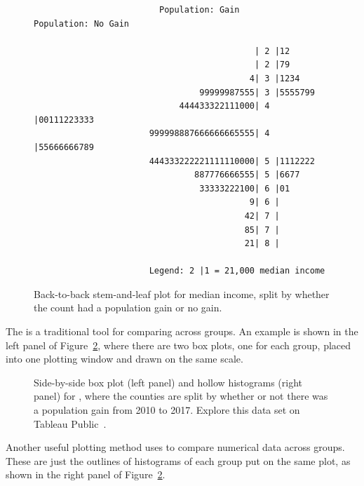 \begin{figure}
\begin{verbatim}
                         Population: Gain           Population: No Gain

                                            | 2 |12                          
                                            | 2 |79                          
                                           4| 3 |1234                    
                                 99999987555| 3 |5555799                 
                             444433322111000| 4 |00111223333              
                       999998887666666665555| 4 |55666666789                
                       444333222221111110000| 5 |1112222                    
                                887776666555| 5 |6677                       
                                 33333222100| 6 |01                          
                                           9| 6 |                             
                                          42| 7 |                             
                                          85| 7 |                             
                                          21| 8 |    
               
                       Legend: 2 |1 = 21,000 median income
\end{verbatim}
\caption{Back-to-back stem-and-leaf plot for median income, split by whether the count had a population gain or no gain.}
\label{stemandleafincomepopgainloss}
\end{figure}

The 
is a traditional tool for comparing across groups.
An example is shown in the left panel of
Figure~\ref{countyIncomeSplitByPopGain},
where there are two box plots, one for each group,
placed into one plotting window and drawn on the same scale.

\begin{figure}
  \centering
{}
  \caption{Side-by-side box plot (left panel)
      and hollow histograms (right panel) for
      ,
      where the counties are split by whether or not there was a population gain from 2010 to 2017.  Explore this data set on Tableau Public~.}
  \label{countyIncomeSplitByPopGain}
\end{figure}

Another useful plotting method uses  to compare numerical data across groups. These are just the outlines of histograms of each group put on the same plot, as shown in the right panel of Figure~\ref{countyIncomeSplitByPopGain}.

